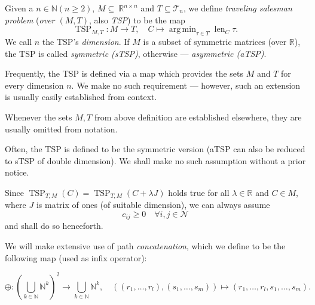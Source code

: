 \documentclass[index=totoc,bibliography=totoc]{scrartcl}
\DeclareMathOperator*{\argmin}{arg\,min}
\let\defstyle\itshape
\begin{document}
\begin{define}
  Given a $n \in \mathbb{N} \left(n \geq 2\right)$,
  $M \subseteq~\mathbb{R}^{n \times n}$ and
  $T \subseteq \mathcal{T}_n$, we define {\defstyle traveling salesman problem}
  ({\defstyle over $(M,T)$}, also {\defstyle TSP}) to be the map
\[
  \operatorname{TSP}_{M,T}: M \to T, \quad
  C \mapsto \argmin_{\tau \in T} \operatorname{len}_C \tau.
\]
We call $n$ the TSP's {\defstyle dimension}.
If $M$ is a subset of symmetric matrices (over $\mathbb{R}$), the TSP is called {\defstyle symmetric (sTSP)},
otherwise --- {\defstyle asymmetric (aTSP)}.
\end{define}

\begin{remark}
Frequently, the TSP is defined via a map which provides the sets $M$ and $T$ for every dimension $n$.
We make no such requirement --- however, such an extension is usually easily established from context.
\end{remark}

\begin{remark}
Whenever the sets $M,T$ from above definition are established elsewhere, they are usually omitted from notation.
\end{remark}

\begin{remark}
Often, the TSP is defined to be the symmetric version (aTSP can also be
reduced to sTSP of double dimension).  We shall make no such assumption
without a prior notice.
\end{remark}

\begin{remark}
Since $\operatorname{TSP}_{T,M}\left(C\right) = \operatorname{TSP}_{T,M}\left(C + \lambda J\right)$
holds true for all $\lambda \in \mathbb{R}$ and $C \in M$,
where $J$ is matrix of ones (of suitable dimension), we can always assume
\[
  c_{ij} \geq 0 \quad \forall i,j \in \mathcal{N}
\]
and shall do so henceforth.
\end{remark}

We will make extensive use of path {\defstyle concatenation}, which we define to be the following map (used as infix operator):
\begin{define}
\[
  \oplus: {\left( \bigcup_{k \in \mathbb{N}}\mathbb{N}^k \right)}^2 \to \bigcup_{k \in \mathbb{N}}\mathbb{N}^k,
  \quad \left(\left(r_1,\ldots,r_l\right), \left(s_1,\ldots,s_m\right)\right) \mapsto \left(r_1,\ldots,r_l,s_1,\ldots,s_m\right).
\]
\end{define}
\end{document}
